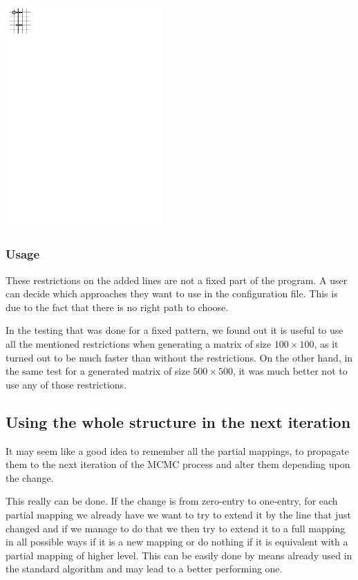 \centerline{\mbox{\includegraphics[width=60mm]{../img/orthogonal.pdf}}}
\subsubsection{Usage}
These restrictions on the added lines are not a fixed part of the program. A user can decide which approaches they want to use in the configuration file. This is due to the fact that there is no right path to choose.

In the testing that was done for a fixed pattern, we found out it is useful to use all the mentioned restrictions when generating a matrix of size $100\times100$, as it turned out to be much faster than without the restrictions. On the other hand, in the same test for a generated matrix of size $500\times500$, it was much better not to use any of those restrictions.

\subsection{Using the whole structure in the next iteration}
It may seem like a good idea to remember all the partial mappings, to propagate them to the next iteration of the MCMC process and alter them depending upon the change.

This really can be done. If the change is from zero-entry to one-entry, for each partial mapping we already have we want to try to extend it by the line that just changed and if we manage to do that we then try to extend it to a full mapping in all possible ways if it is a new mapping or do nothing if it is equivalent with a partial mapping of higher level. This can be easily done by means already used in the standard algorithm and may lead to a better performing one.

